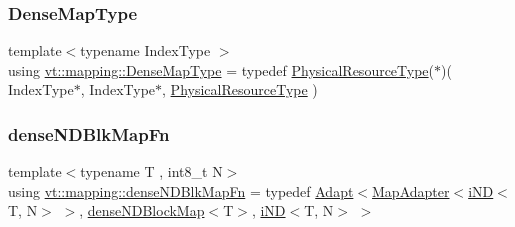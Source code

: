 \mbox{\label{namespacevt_1_1mapping_a64f0fc107b569bb6644f1b015c6e7ad8}} 
\subsubsection{\texorpdfstring{Dense\+Map\+Type}{DenseMapType}}
{\footnotesize\ttfamily template$<$typename Index\+Type $>$ \\
using \hyperlink{namespacevt_1_1mapping_a64f0fc107b569bb6644f1b015c6e7ad8}{vt\+::mapping\+::\+Dense\+Map\+Type} = typedef \hyperlink{namespacevt_a2dc36fcada816dc6d11774d650328ee9}{Physical\+Resource\+Type}($\ast$)( Index\+Type$\ast$, Index\+Type$\ast$, \hyperlink{namespacevt_a2dc36fcada816dc6d11774d650328ee9}{Physical\+Resource\+Type} )}

\mbox{\label{namespacevt_1_1mapping_add8e2f407f58eb99d2cadc0cc2801e7a}} 
\subsubsection{\texorpdfstring{dense\+N\+D\+Blk\+Map\+Fn}{denseNDBlkMapFn}}
{\footnotesize\ttfamily template$<$typename T , int8\+\_\+t N$>$ \\
using \hyperlink{namespacevt_1_1mapping_add8e2f407f58eb99d2cadc0cc2801e7a}{vt\+::mapping\+::dense\+N\+D\+Blk\+Map\+Fn} = typedef \hyperlink{namespacevt_1_1mapping_aafe187035ce8df02f31983e37cdb6a5d}{Adapt}$<$\hyperlink{namespacevt_1_1mapping_a41b113c28bb6430fbcb5be66e08ccf9f}{Map\+Adapter}$<$\hyperlink{namespacevt_1_1mapping_ad53b53dc14e67437c17cefe9c3c70380}{i\+ND}$<$T, N$>$ $>$, \hyperlink{namespacevt_1_1mapping_a8e5581179e571387304de4b1d19640e7}{dense\+N\+D\+Block\+Map}$<$T$>$, \hyperlink{namespacevt_1_1mapping_ad53b53dc14e67437c17cefe9c3c70380}{i\+ND}$<$T, N$>$ $>$}

\mbox{\label{namespacevt_1_1mapping_a02a4066fb2101421d657a9f601cc9977}} 
